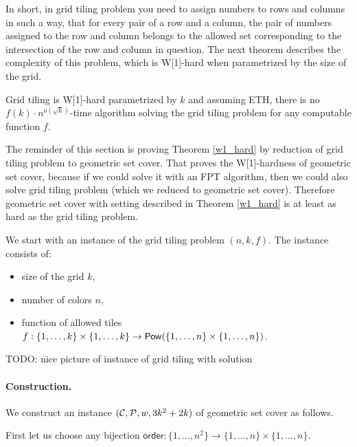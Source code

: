 In short, in grid tiling problem you need to assign numbers
to rows and columns in such a way,
that for every pair of a row and a column,
the pair of numbers assigned
to the row and column 
belongs to the allowed set corresponding to the intersection
of the row and column in question.
The next theorem describes the complexity of this problem,
which is W[1]-hard when parametrized by the size of the grid.

\begin{tw}
\label{grid_tiling_w1_hard}
\textbf{\cite{marx_grid_tiling}}
Grid tiling is W[1]-hard parametrized by $k$ and
assuming ETH, there is no $f(k)\cdot n^{o(\sqrt{k})}$-time
algorithm solving the grid tiling problem
for any computable function $f$.
\end{tw}

The reminder of this section is proving Theorem \ref{w1_hard}
by reduction of grid tiling problem to geometric set cover.
That proves the W[1]-hardness of geometric set cover,
because if we could solve it with an FPT algorithm,
then we could also solve grid tiling problem
(which we reduced to geometric set cover).
Therefore geometric set cover with setting
described in Theorem \ref{w1_hard}
is at least as hard as the grid tiling problem.

We start with an instance of the grid tiling problem $(n, k, f)$.
The instance consists of:
\begin{itemize}
\item size of the grid $k$,
\item number of colors $n$,
\item function of allowed tiles
$f : \{1, \ldots, k\} \times \{1, \ldots, k\} \rightarrow \mathsf{Pow}(\{1, \ldots, n\} \times \{1, \ldots, n\})$.
\end{itemize}

TODO: nice picture of instance of grid tiling with solution

\paragraph{Construction.}
\newcommand{\order}{\mathsf{order}}
\newcommand{\matchv}{\mathsf{match}_v}
\newcommand{\matchh}{\mathsf{match}_h}
\newcommand{\instanceSetCover}{(\points, \sets, w, 3k^2+2k)}
We construct an instance $\instanceSetCover$ of geometric set cover as follows.

First let us choose any bijection
$\order : \{1, \ldots, n^2\} \rightarrow \{1, \ldots, n\} \times \{1, \ldots, n\}$.


